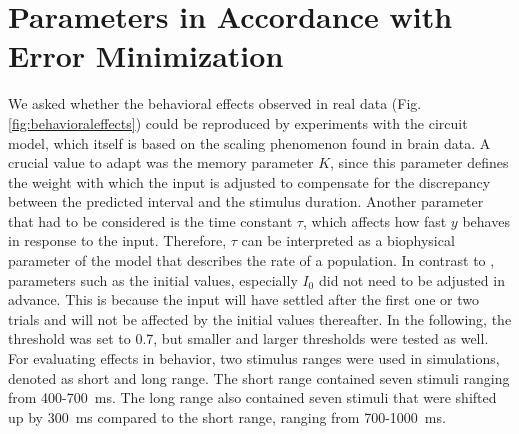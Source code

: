 \documentclass[10pt]{article}
\begin{document}
\section{Parameters in Accordance with Error Minimization}
We asked whether the behavioral effects observed in real data (Fig. \ref{fig:behavioraleffects}) could be reproduced by experiments with the circuit model, which itself is based on the scaling phenomenon found in brain data. 
A crucial value to adapt was the memory parameter $K$, since this parameter defines the weight with which the input is adjusted to compensate for the discrepancy between the predicted interval and the stimulus duration.
Another parameter that had to be considered is the time constant $\tau$, which affects how fast $y$ behaves in response to the input. Therefore, $\tau$ can be interpreted as a biophysical parameter of the model that describes the rate of a population.
In contrast to \cite{Egger2020}, parameters such as the initial values, especially $I_0$ did not need to be adjusted in advance. This is because the input will have settled after the first one or two trials and will not be affected by the initial values thereafter.
In the following, the threshold was set to 0.7, but smaller and larger thresholds were tested as well.
For evaluating effects in behavior, two stimulus ranges were used in simulations, denoted as short and long range. The short range contained seven stimuli ranging from 400-700~ms. The long range also contained seven stimuli that were shifted up by 300~ms compared to the short range, ranging from 700-1000~ms.

 
\end{document}
